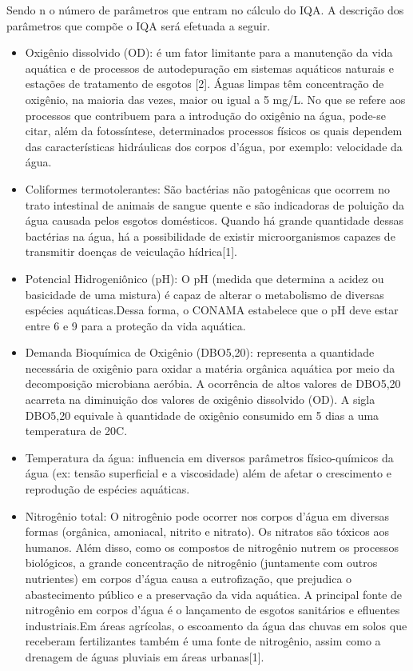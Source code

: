 \documentclass[12pt,openright,oneside,a4paper,brazil]{abntex2}
\begin{document}
Sendo n o número de parâmetros que entram no cálculo do IQA.
A descrição dos parâmetros que compõe o IQA será efetuada a seguir.
\begin{itemize}
\item Oxigênio dissolvido (OD): é um fator limitante para a manutenção da vida aquática e de processos de autodepuração em sistemas aquáticos naturais e estações de tratamento de esgotos [2]. Águas limpas têm concentração de oxigênio, na maioria das vezes, maior ou igual a 5 mg/L. 
No que se refere aos processos que contribuem para a introdução do oxigênio na água, pode-se citar, além da fotossíntese, determinados processos físicos os quais dependem das características hidráulicas dos corpos d’água, por exemplo: velocidade da água.
\item Coliformes termotolerantes: São bactérias não patogênicas que ocorrem no trato intestinal de animais de sangue quente e são indicadoras de poluição da água causada pelos esgotos domésticos. Quando há grande quantidade dessas bactérias na água, há a possibilidade de existir microorganismos capazes de transmitir doenças de veiculação hídrica[1].
\item Potencial Hidrogeniônico (pH): O pH (medida que determina a acidez ou basicidade de uma mistura) é capaz de alterar o metabolismo de diversas espécies aquáticas.Dessa forma, o CONAMA estabelece que o pH deve estar entre 6 e 9 para a proteção da vida aquática.
\item Demanda Bioquímica de Oxigênio (DBO5,20): representa a quantidade necessária de oxigênio para oxidar a matéria orgânica aquática por meio da decomposição microbiana aeróbia. A ocorrência de altos valores de DBO5,20 acarreta na diminuição   dos valores de oxigênio dissolvido (OD). A sigla DBO5,20 equivale à quantidade de oxigênio consumido em 5 dias a uma temperatura de 20C.
\item Temperatura da água: influencia em diversos parâmetros físico-químicos da água (ex: tensão superficial e a viscosidade) além de afetar o crescimento e reprodução de espécies aquáticas.
\item Nitrogênio total: O nitrogênio pode ocorrer nos corpos d’água em diversas formas (orgânica, amoniacal, nitrito e nitrato). Os nitratos são tóxicos aos humanos.
Além disso, como os compostos de nitrogênio nutrem os processos biológicos, a grande concentração de nitrogênio (juntamente com outros nutrientes) em corpos d’água causa a eutrofização, que prejudica o abastecimento público e a preservação da vida aquática. A principal fonte de nitrogênio em corpos d’água é o lançamento de esgotos sanitários e efluentes industriais.Em áreas agrícolas, o escoamento da água das chuvas em solos que receberam fertilizantes também é uma fonte de nitrogênio, assim como a drenagem de águas pluviais em áreas urbanas[1].

\end{itemize}
\end{document}
